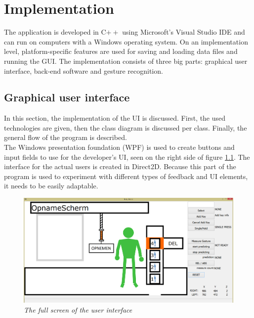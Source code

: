 \chapter{Implementation}

The application is developed in C$++$ using Microsoft's Visual Studio IDE and can run on computers with a Windows operating system. On an implementation level, platform-specific features are used for saving and loading data files and running the GUI. The implementation consists of three big parts: graphical user interface, back-end software and gesture recognition.\\


\section{Graphical user interface}

In this section, the implementation of the UI is discussed. First, the used technologies are given, then the class diagram is discussed per class. Finally, the general flow of the program is described.\\

The Windows presentation foundation (WPF) is used to create buttons and input fields to use for the developer's UI, seen on the right side of figure \ref{real implementation}. The interface for the actual users is created in Direct2D. Because this part of the program is used to experiment with different types of feedback and UI elements, it needs to be easily adaptable.

\begin{figure}[H]
	\begin{center}
		\includegraphics[width=14cm]{figures/1_full_screen_with_user.png}
		\caption{\emph{The full screen of the user interface}}
		\label{real implementation}
	\end{center}
\end{figure}

